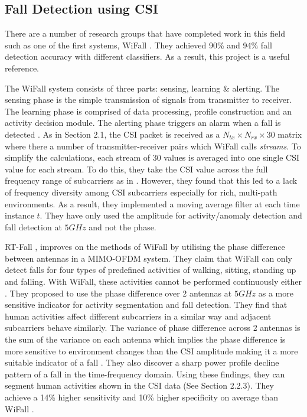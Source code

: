 \subsection{Fall Detection using CSI}
There are a number of research groups that have completed work in this field such as one of the first systems, WiFall \citep{WiFall}. They achieved 90\% and 94\% fall detection accuracy with different classifiers. As a result, this project is a useful reference. \par
The WiFall system consists of three parts: sensing, learning \& alerting. The sensing phase is the simple transmission of signals from transmitter to receiver. The learning phase is comprised of data processing, profile construction and an activity decision module. The alerting phase triggers an alarm when a fall is detected \citep{WiFall}. As in Section 2.1, the CSI packet is received as a $N_{tx}\times N_{rx}\times 30$ matrix where there a number of transmitter-receiver pairs which WiFall calls \textit{streams}. To simplify the calculations, each stream of 30 values is averaged into one single CSI value for each stream. To do this, they take the CSI value across the full frequency range of subcarriers as in \cite{FilaIndoor}. However, they found that this led to a lack of frequency diversity among CSI subcarriers especially for rich, multi-path environments. As a result, they implemented a moving average filter at each time instance $t$. They have only used the amplitude for activity/anomaly detection and fall detection at $5GHz$ and not the phase. \par
RT-Fall \cite{RTFall}, improves on the methods of WiFall by utilising the phase difference between antennas in a MIMO-OFDM system. They claim that WiFall can only detect falls for four types of predefined activities of walking, sitting, standing up and falling. With WiFall, these activities cannot be performed continuously either \citep{RTFall}. They proposed to use the phase difference over 2 antennas at $5GHz$ as a more sensitive indicator for activity segmentation and fall detection. They find that human activities affect different subcarriers in a similar way and adjacent subcarriers behave similarly. The variance of phase difference across 2 antennas is the sum of the variance on each antenna which implies the phase difference is more sensitive to environment changes than the CSI amplitude making it a more suitable indicator of a fall \citep{PhaseU}. They also discover a sharp power profile decline pattern of a fall in the time-frequency domain. Using these findings, they can segment human activities shown in the CSI data (See Section 2.2.3). They achieve a 14\% higher sensitivity and 10\% higher specificity on average than WiFall \citep{RTFall}.
